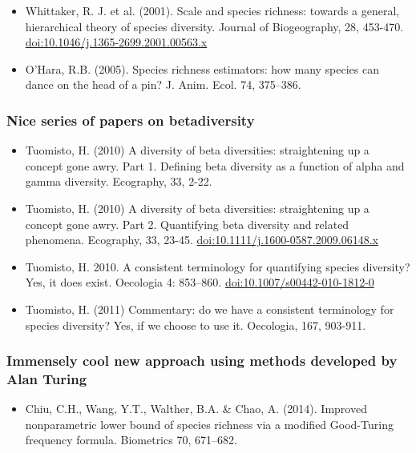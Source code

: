 \documentclass[]{book}
\providecommand{\tightlist}{%
  \setlength{\itemsep}{0pt}\setlength{\parskip}{0pt}}
\begin{document}
\begin{itemize}
\tightlist
\item
  Whittaker, R. J. et al. (2001). Scale and species richness: towards a
  general, hierarchical theory of species diversity. Journal of
  Biogeography, 28, 453-470. \url{doi:10.1046/j.1365-2699.2001.00563.x}
\item
  O'Hara, R.B. (2005). Species richness estimators: how many species can
  dance on the head of a pin? J. Anim. Ecol. 74, 375--386.
\end{itemize}

\subsubsection{Nice series of papers on
betadiversity}\label{nice-series-of-papers-on-betadiversity}

\begin{itemize}
\tightlist
\item
  Tuomisto, H. (2010) A diversity of beta diversities: straightening up
  a concept gone awry. Part 1. Defining beta diversity as a function of
  alpha and gamma diversity. Ecography, 33, 2-22.
\item
  Tuomisto, H. (2010) A diversity of beta diversities: straightening up
  a concept gone awry. Part 2. Quantifying beta diversity and related
  phenomena. Ecography, 33, 23-45.
  \url{doi:10.1111/j.1600-0587.2009.06148.x}
\item
  Tuomisto, H. 2010. A consistent terminology for quantifying species
  diversity? Yes, it does exist. Oecologia 4: 853--860.
  \url{doi:10.1007/s00442-010-1812-0}
\item
  Tuomisto, H. (2011) Commentary: do we have a consistent terminology
  for species diversity? Yes, if we choose to use it. Oecologia, 167,
  903-911.
\end{itemize}

\subsubsection{Immensely cool new approach using methods developed by
Alan
Turing}\label{immensely-cool-new-approach-using-methods-developed-by-alan-turing}

\begin{itemize}
\tightlist
\item
  Chiu, C.H., Wang, Y.T., Walther, B.A. \& Chao, A. (2014). Improved
  nonparametric lower bound of species richness via a modified
  Good-Turing frequency formula. Biometrics 70, 671--682.
\end{itemize}
\end{document}

